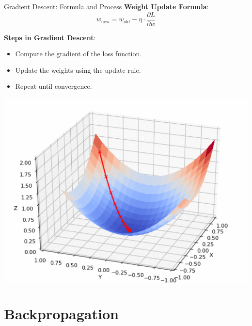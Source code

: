 \documentclass[serif, aspectratio=169]{beamer}
\begin{document}
\begin{frame}{Gradient Descent: Formula and Process}
    \textbf{Weight Update Formula}:
    \[
    w_{\text{new}} = w_{\text{old}} - \eta \cdot \frac{\partial L}{\partial w}
    \]

    \textbf{Steps in Gradient Descent}:
    \begin{itemize}
        \item Compute the gradient of the loss function.
        \item Update the weights using the update rule.
        \item Repeat until convergence.
    \end{itemize}
    
    \vspace{-2cm} %
    \begin{flushright}
        \includegraphics[scale=0.3]{pic/GD.png} %
    \end{flushright}

\end{frame}


\section{Backpropagation}
\end{document}
